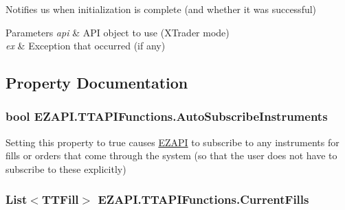 Notifies us when initialization is complete (and whether it was successful) 


\begin{DoxyParams}{Parameters}
{\em api} & A\-P\-I object to use (X\-Trader mode)\\
\hline
{\em ex} & Exception that occurred (if any)\\
\hline
\end{DoxyParams}


\subsection{Property Documentation}
\hypertarget{class_e_z_a_p_i_1_1_t_t_a_p_i_functions_ab4aee7e6bb8e8113fe04704c4a19e815}{
\subsubsection[{Auto\-Subscribe\-Instruments}]{\setlength{\rightskip}{0pt plus 5cm}bool E\-Z\-A\-P\-I.\-T\-T\-A\-P\-I\-Functions.\-Auto\-Subscribe\-Instruments\hspace{0.3cm}{\ttfamily [get]}}}\label{class_e_z_a_p_i_1_1_t_t_a_p_i_functions_ab4aee7e6bb8e8113fe04704c4a19e815}


Setting this property to true causes \hyperlink{namespace_e_z_a_p_i}{E\-Z\-A\-P\-I} to subscribe to any instruments for fills or orders that come through the system (so that the user does not have to subscribe to these explicitly) 

\hypertarget{class_e_z_a_p_i_1_1_t_t_a_p_i_functions_a6a49dc7c0326a25deabb1857abc56cfe}{
\subsubsection[{Current\-Fills}]{\setlength{\rightskip}{0pt plus 5cm}List$<${\bf T\-T\-Fill}$>$ E\-Z\-A\-P\-I.\-T\-T\-A\-P\-I\-Functions.\-Current\-Fills\hspace{0.3cm}{\ttfamily [get]}}}\label{class_e_z_a_p_i_1_1_t_t_a_p_i_functions_a6a49dc7c0326a25deabb1857abc56cfe}


